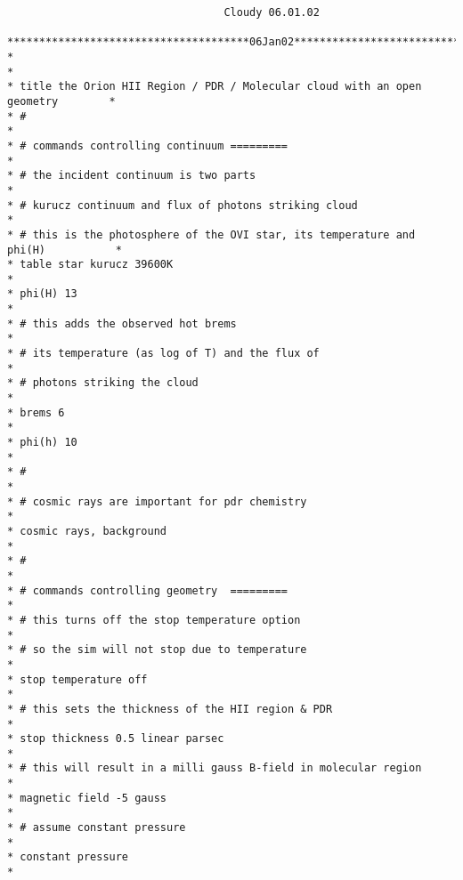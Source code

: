 {\setverbatimfontsize{\tiny}
\begin{verbatim}
                                  Cloudy 06.01.02

**************************************06Jan02**************************************
*                                                                                 *
* title the Orion HII Region / PDR / Molecular cloud with an open geometry        *
* #                                                                               *
* # commands controlling continuum =========                                      *
* # the incident continuum is two parts                                           *
* # kurucz continuum and flux of photons striking cloud                           *
* # this is the photosphere of the OVI star, its temperature and phi(H)           *
* table star kurucz 39600K                                                        *
* phi(H) 13                                                                       *
* # this adds the observed hot brems                                              *
* # its temperature (as log of T) and the flux of                                 *
* # photons striking the cloud                                                    *
* brems 6                                                                         *
* phi(h) 10                                                                       *
* #                                                                               *
* # cosmic rays are important for pdr chemistry                                   *
* cosmic rays, background                                                         *
* #                                                                               *
* # commands controlling geometry  =========                                      *
* # this turns off the stop temperature option                                    *
* # so the sim will not stop due to temperature                                   *
* stop temperature off                                                            *
* # this sets the thickness of the HII region & PDR                               *
* stop thickness 0.5 linear parsec                                                *
* # this will result in a milli gauss B-field in molecular region                 *
* magnetic field -5 gauss                                                         *
* # assume constant pressure                                                      *
* constant pressure                                                               *

\end{verbatim}}
